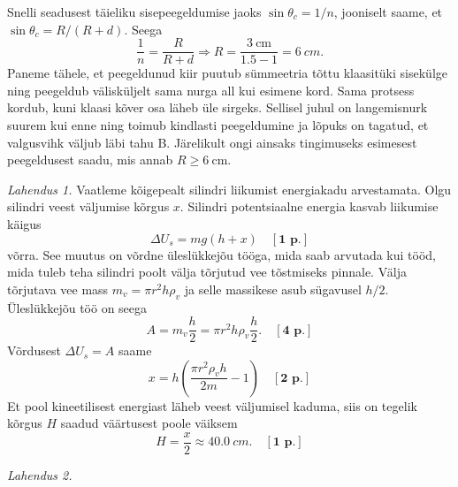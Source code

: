 \documentclass[10pt]{article}
\begin{document}
Snelli seadusest täieliku sisepeegeldumise jaoks
$\sin\theta_c = {1}/{n}$, jooniselt saame, et $\sin\theta_c=R/(R+d)$. Seega
$$\frac{1}{n}=\frac{R}{R+d}\Rightarrow R = \frac{\SI{3}{\cm}}{1.5-1}=\SI{6}{cm}.$$
Paneme tähele, et peegeldunud kiir puutub sümmeetria tõttu klaasitüki sisekülge ning peegeldub välisküljelt sama nurga all kui esimene kord. Sama protsess kordub, kuni klaasi kõver osa läheb üle sirgeks. Sellisel juhul on langemisnurk suurem kui enne ning toimub kindlasti peegeldumine ja lõpuks on tagatud, et valgusvihk väljub läbi tahu B. Järelikult ongi ainsaks tingimuseks esimesest peegeldusest saadu, mis annab $R\geq\SI{6}{\cm}$.
\probend
\bigskip

\setAuthor{}

\solu
\emph{Lahendus 1.}
Vaatleme kõigepealt silindri liikumist energiakadu arvestamata. Olgu silindri veest väljumise kõrgus $x$. Silindri potentsiaalne energia kasvab liikumise käigus
\[
\Delta U_s=mg(h+x)\quad[\textbf{1 p.}]
\]
võrra. See muutus on võrdne üleslükkejõu tööga, mida saab arvutada kui tööd, mida tuleb teha silindri poolt välja tõrjutud vee tõstmiseks pinnale. Välja tõrjutava vee mass $m_v=\pi r^2 h \rho_v$ ja selle massikese asub sügavusel $h/2$. Üleslükkejõu töö on seega
\[
A=m_v\frac{h}{2}=\pi r^2 h \rho_v\frac{h}{2}.\quad[\textbf{4 p.}]
\]
Võrdusest $\Delta U_s=A$ saame
\[
x=h\left(\frac{\pi r^2 \rho_v h}{2m}-1\right) \quad[\textbf{2 p.}]
\]
Et pool kineetilisest energiast läheb veest väljumisel kaduma, siis on tegelik kõrgus $H$ saadud väärtusest poole väiksem
\[
H=\frac{x}{2}\approx\SI{40.0}{cm}. \quad[\textbf{1 p.}]
\]


\emph{Lahendus 2.}
\end{document}
